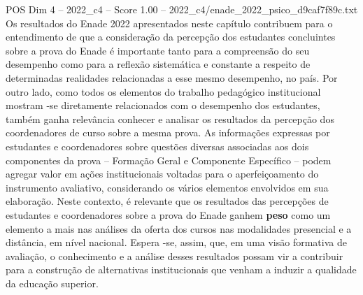 \begin{textsample}{POS Dim 4 – 2022\_c4 – Score 1.00 – 2022\_c4/enade\_2022\_psico\_d9caf7f89c.txt}
Os resultados do Enade 2022 apresentados neste capítulo contribuem para o entendimento de que a consideração da percepção dos estudantes concluintes sobre a prova do Enade é importante tanto para a compreensão do seu desempenho como para a reflexão sistemática e constante a respeito de determinadas realidades relacionadas a esse mesmo desempenho, no país.
Por outro lado, como todos os elementos do trabalho pedagógico institucional mostram -se diretamente relacionados com o desempenho dos estudantes, também ganha relevância conhecer e analisar os resultados da percepção dos coordenadores de curso sobre a mesma prova.
As informações expressas por estudantes e coordenadores sobre questões diversas associadas aos dois componentes da prova – Formação Geral e Componente Específico – podem agregar valor em ações institucionais voltadas para o aperfeiçoamento do instrumento avaliativo, considerando os vários elementos envolvidos em sua elaboração.
Neste contexto, é relevante que os resultados das percepções de estudantes e coordenadores sobre a prova do Enade ganhem \textbf{peso} como um elemento a mais nas análises da oferta dos cursos nas modalidades presencial e a distância, em nível nacional.
Espera -se, assim, que, em uma visão formativa de avaliação, o conhecimento e a análise desses resultados possam vir a contribuir para a construção de alternativas institucionais que venham a induzir a qualidade da educação superior.

\end{textsample}

